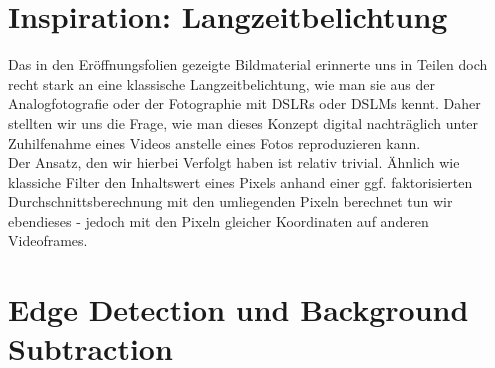 \documentclass[12pt]{scrartcl}
\begin{document}



\section{Inspiration: Langzeitbelichtung} %
Das in den Er\"offnungsfolien gezeigte Bildmaterial erinnerte uns in Teilen doch recht stark an eine klassische Langzeitbelichtung, wie man sie aus der Analogfotografie oder der Fotographie mit DSLRs oder DSLMs kennt. Daher stellten wir uns die Frage, wie man dieses Konzept digital nachtr\"aglich unter Zuhilfenahme eines Videos anstelle eines Fotos reproduzieren kann. \\
Der Ansatz, den wir hierbei Verfolgt haben ist relativ trivial. \"Ahnlich wie klassiche Filter den Inhaltswert eines Pixels anhand einer ggf. faktorisierten Durchschnittsberechnung mit den umliegenden Pixeln berechnet tun wir ebendieses - jedoch mit den Pixeln gleicher Koordinaten auf anderen Videoframes. 

\section{Edge Detection und Background Subtraction}
\end{document}
